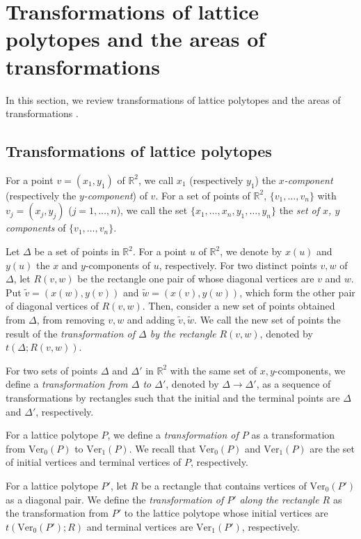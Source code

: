 \documentclass[a4paper,11pt]{amsart}
\numberwithin{equation}{section}
\begin{document}
\section{Transformations of lattice polytopes and the areas of  transformations}\label{sec1}
In this section, we review transformations of lattice polytopes and the areas of transformations \cite{N}. 
\subsection{Transformations of lattice polytopes}
  
For a point $v=(x_1,y_1)$ of $\mathbb{R}^2$, we call $x_1$ (respectively $y_1$) the {\it $x$-component} (respectively the {\it $y$-component}) of $v$. 
For a set of points of $\mathbb{R}^2$, $\{ v_1, \ldots, v_n\}$  with $v_j=(x_j, y_j)$ ($j=1,\dots, n$), we call the set $\{ x_1, \ldots, x_n, y_1,\ldots, y_n\}$ the {\it set of $x$, $y$ components} of $\{ v_1,\ldots, v_n\}$. 

\begin{definition}
Let $\Delta$ be a set of points in $\mathbb{R}^2$. For a point $u$ of $\mathbb{R}^2$, we denote by $x(u)$ and $y(u)$ the $x$ and $y$-components of $u$, respectively.  For two distinct points $v, w$ of $\Delta$, 
let $R(v, w)$ be the rectangle one pair of whose diagonal vertices are $v$ and $w$. Put $\tilde{v}=(x(w), y(v))$ and $\tilde{w}=(x(v), y(w))$, which form the other pair of diagonal vertices of $R(v,w)$. Then, consider a new set of points obtained from $\Delta$, from removing $v,w$ and adding $\tilde{v}, \tilde{w}$. 
We call the new set of points the result of the {\it transformation of $\Delta$ by the rectangle} $R(v, w)$, denoted by $t( \Delta; R(v, w))$. 

For two sets of points $\Delta$ and $\Delta'$ in $\mathbb{R}^2$ with the same set of $x, y$-components, we define a {\it transformation from $\Delta$ to $\Delta'$}, denoted by $\Delta \to \Delta'$, as a sequence of transformations by rectangles such that the initial and the terminal points are $\Delta$ and $\Delta'$, respectively. 

For a lattice polytope $P$, we define a {\it transformation of $P$} as a transformation from $\mathrm{Ver}_0(P)$ to $\mathrm{Ver}_1(P)$. We recall that $\mathrm{Ver}_0(P)$ and $\mathrm{Ver}_1(P)$ are the set of initial vertices and terminal vertices of $P$, respectively. 

For a lattice polytope $P'$, let $R$ be a rectangle that contains vertices of $\mathrm{Ver}_0(P')$ as a diagonal pair. 
We define the {\it transformation of $P'$ along the rectangle $R$} as 
the transformation from $P'$ to the lattice polytope whose initial vertices  are $t(\mathrm{Ver}_0(P'); R)$ and terminal vertices are $\mathrm{Ver}_1(P')$, respectively. 
\end{definition}
\end{document}
